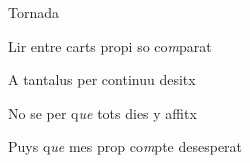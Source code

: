 \documentclass[12pt]{article}
\begin{document}
\begin{estrofaExtra}%




\begin{tornada}

Tornada

\end{tornada}


\end{estrofaExtra}


\begin{estrofa}

 Lir entre carts propi so co\textit{m}parat

 A tantalus per continuu desitx

 No se per q\textit{ue} tots dies y affitx

 Puys q\textit{ue} mes prop co\textit{m}pte desesperat

\end{estrofa}
\end{document}
